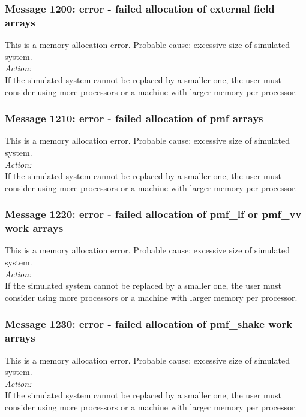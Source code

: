 \subsubsection*{Message 1200: error - failed allocation of external
field arrays}

This is a memory allocation error. Probable cause: excessive size of
simulated system. \\

\noindent
{\em Action:}\\
If the simulated system cannot be replaced by a smaller one, the user
must consider using more processors or a machine with larger memory
per processor.

\subsubsection*{Message 1210: error - failed allocation of pmf arrays}

This is a memory allocation error. Probable cause: excessive size of
simulated system. \\

\noindent
{\em Action:}\\
If the simulated system cannot be replaced by a smaller one, the user
must consider using more processors or a machine with larger memory
per processor.

\subsubsection*{Message 1220: error - failed allocation of pmf\_lf or
pmf\_vv work arrays}

This is a memory allocation error. Probable cause: excessive size of
simulated system. \\

\noindent
{\em Action:}\\
If the simulated system cannot be replaced by a smaller one, the user
must consider using more processors or a machine with larger memory
per processor.

\subsubsection*{Message 1230: error - failed allocation of pmf\_shake
work arrays}

This is a memory allocation error. Probable cause: excessive size of
simulated system. \\

\noindent
{\em Action:}\\
If the simulated system cannot be replaced by a smaller one, the user
must consider using more processors or a machine with larger memory
per processor.

